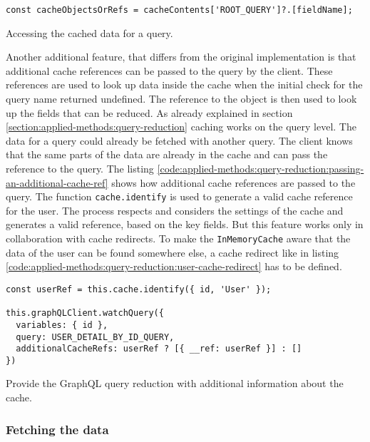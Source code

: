 \ifshowListings
\begin{listing}[H]
\begin{verbatim}
const cacheObjectsOrRefs = cacheContents['ROOT_QUERY']?.[fieldName];
\end{verbatim}
\caption{Accessing the cached data for a query.}\label{code:applied-methods:query-reduction:getting-cache-content}
\end{listing}
\fi

\noindent Another additional feature, that differs from the original implementation is that additional cache references can be passed to the query by the client. These references are used to look up data inside the cache when the initial check for the query name returned undefined. The reference to the object is then used to look up the fields that can be reduced. As already explained in section \ref{section:applied-methods:query-reduction} caching works on the query level. The data for a query could already be fetched with another query. The client knows that the same parts of the data are already in the cache and can pass the reference to the query. The listing \ref{code:applied-methods:query-reduction:passing-an-additional-cache-ref} shows how additional cache references are passed to the query. The function \texttt{cache.identify} is used to generate a valid cache reference for the user. The process respects and considers the settings of the cache and generates a valid reference, based on the key fields. But this feature works only in collaboration with cache redirects. To make the \texttt{InMemoryCache} aware that the data of the user can be found somewhere else, a cache redirect like in listing \ref{code:applied-methods:query-reduction:user-cache-redirect} has to be defined.

\ifshowListings
\begin{listing}[H]
\begin{verbatim}
const userRef = this.cache.identify({ id, 'User' });

this.graphQLClient.watchQuery({
  variables: { id },
  query: USER_DETAIL_BY_ID_QUERY,
  additionalCacheRefs: userRef ? [{ __ref: userRef }] : []
})
\end{verbatim}
\caption{Provide the GraphQL query reduction with additional information about the cache.}\label{code:applied-methods:query-reduction:passing-an-additional-cache-ref}
\end{listing}
\fi

\subsubsection{Fetching the data}

